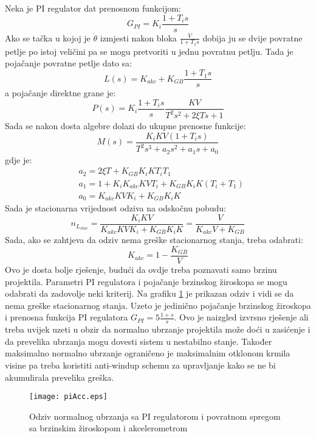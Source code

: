 Neka je PI regulator dat prenosnom funkcijom:
\begin{equation}
    G_{PI} = K_i\frac{1+T_is}{s}
\end{equation}
Ako se tačka u kojoj je $\dot{\theta}$ izmjesti nakon bloka $\frac{V}{1+T_1s}$ dobija ju se 
dvije povratne petlje po istoj veličini pa se mogu pretvoriti u jednu povratnu petlju. Tada je 
pojačanje povratne petlje dato sa:
\begin{equation}
    L(s) = K_{akc}+K_{GB}\frac{1+T_1s}{s}
\end{equation}
a pojačanje direktne grane je:
\begin{equation}
    P(s)=K_i\frac{1+T_is}{s}\frac{KV}{T^2s^2+2\xi Ts+1}
\end{equation}
Sada se nakon dosta algebre dolazi do ukupne prenosne funkcije:
\begin{equation}
    M(s)=\frac{K_iKV(1+T_is)}{T^2s^3+a_2s^2+a_1s + a_0}
\end{equation}
gdje je:
\begin{align*}
    & a_2 = 2\xi T+K_{GB}K_iKT_iT_1 \\
    & a_1 = 1+K_iK_{akc}KVT_i+K_{GB}K_iK(T_i+T_1)\\
    & a_0 = K_{akc}KVK_i+K_{GB}K_iK
\end{align*}
Sada je stacionarna vrijednost odziva na odskočnu pobudu:
\begin{equation}
    n_{L_{stac}} = \frac{K_iKV}{K_{akc}KVK_i+K_{GB}K_iK} = \frac{V}{K_{akc}V+K_{GB}}
\end{equation}
Sada, ako se zahtjeva da odziv nema greške stacionarnog stanja, treba odabrati:
\begin{equation}
    K_{akc} = 1-\frac{K_{GB}}{V}
\end{equation}
Ovo je dosta bolje rješenje, budući da ovdje treba poznavati samo brzinu projektila. Parametri 
PI regulatora i pojačanje brzinskog žiroskopa se mogu odabrati da zadovolje neki kriterij. 
Na grafiku \ref{fig:piAcc} je prikazan odziv i vidi se da nema greške stacionarnog stanja. 
Uzeto je jedinično pojačanje brzinskog žiroskopa i prenosna funkcija PI regulatora $G_{PI}=5\frac{1+s}{s}$. 
Ovo je naizgled izvrsno rješenje ali treba uvijek uzeti u obzir da normalno ubrzanje projektila 
može doći u zasićenje i da prevelika ubrzanja mogu dovesti sistem u nestabilno stanje. Također 
maksimalno normalno ubrzanje ograničeno je maksimalnim otklonom krmila visine pa treba koristiti 
anti-windup schemu za upravljanje kako se ne bi akumulirala prevelika greška.  
\begin{figure}[!ht]
    \centering
    \texttt{[image: piAcc.eps]}
    \caption{Odziv normalnog ubrzanja sa PI regulatorom i povratnom spregom 
    sa brzinskim žiroskopom i akcelerometrom}
    \label{fig:piAcc}
\end{figure}
